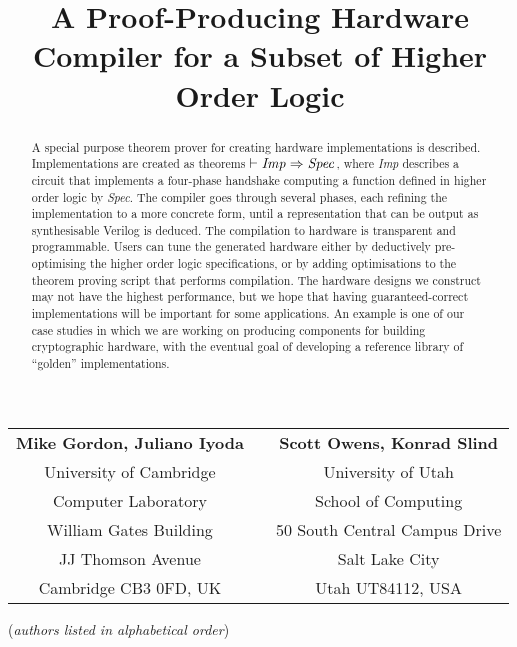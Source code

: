 \documentclass{llncs}
\title{A Proof-Producing Hardware Compiler for a Subset of Higher Order Logic}
\author{}
\institute{}
\begin{document}
\maketitle

\vspace*{-8mm}

\begin{center}
\begin{tabular}{ccc}
{\bf Mike Gordon, Juliano Iyoda} &\hspace*{5mm}& {\bf Scott Owens, Konrad Slind}\\
University of Cambridge          &\hspace*{5mm}& University of Utah\\
Computer Laboratory              &\hspace*{5mm}& School of Computing\\
William Gates Building           &\hspace*{5mm}& 50 South Central Campus Drive\\
JJ Thomson Avenue                &\hspace*{5mm}& Salt Lake City\\
Cambridge CB3 0FD, UK            &\hspace*{5mm}& Utah UT84112, USA
\end{tabular}


\vspace*{2mm}

({\it{authors listed in alphabetical order\/}})
\end{center}

\vspace*{-5mm}

\thispagestyle{empty}

\begin{abstract}
A special purpose theorem prover for creating hardware implementations
is described.  Implementations are created as theorems $\vdash
{\it{Imp}}\Rightarrow{\it{Spec}}$, where {\it{Imp}} describes a
circuit that implements a four-phase handshake computing a function
defined in higher order logic by {\it{Spec}}.  The compiler goes
through several phases, each refining the implementation to a more
concrete form, until a representation that can be output as
synthesisable Verilog is deduced.  The compilation to hardware is
transparent and programmable. Users can tune the generated hardware
either by deductively pre-optimising the higher order logic
specifications, or by adding optimisations to the theorem proving
script that performs compilation.  The hardware designs we construct
may not have the highest performance, but we hope that having
guaranteed-correct implementations will be important for some applications.
An example is one of our case studies in which we are working on
producing components for building cryptographic hardware, with
the eventual goal of developing a reference library of ``golden''
implementations.


\end{abstract}
\end{document}
